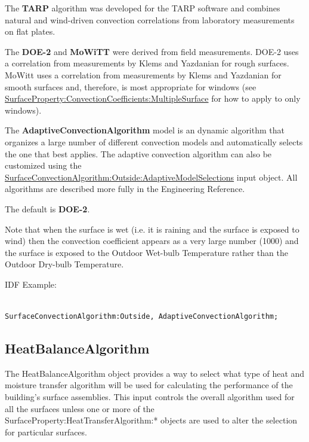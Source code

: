 The \textbf{TARP} algorithm was developed for the TARP software and combines natural and wind-driven convection correlations from laboratory measurements on flat plates.

The \textbf{DOE-2} and \textbf{MoWiTT} were derived from field measurements. DOE-2 uses a correlation from measurements by Klems and Yazdanian for rough surfaces. MoWitt uses a correlation from measurements by Klems and Yazdanian for smooth surfaces and, therefore, is most appropriate for windows (see \hyperref[surfacepropertyconvectioncoefficientsmultiplesurface]{SurfaceProperty:ConvectionCoefficients:MultipleSurface} for how to apply to only windows).

The \textbf{AdaptiveConvectionAlgorithm} model is an dynamic algorithm that organizes a large number of different convection models and automatically selects the one that best applies. The adaptive convection algorithm can also be customized using the \hyperref[surfaceconvectionalgorithmoutsideadaptivemodelselections]{SurfaceConvectionAlgorithm:Outside:AdaptiveModelSelections} input object. All algorithms are described more fully in the Engineering Reference.

The default is \textbf{DOE-2}.

Note that when the surface is wet (i.e. it is raining and the surface is exposed to wind) then the convection coefficient appears as a very large number (1000) and the surface is exposed to the Outdoor Wet-bulb Temperature rather than the Outdoor Dry-bulb Temperature.

IDF Example:

\begin{lstlisting}

SurfaceConvectionAlgorithm:Outside, AdaptiveConvectionAlgorithm;
\end{lstlisting}

\subsection{HeatBalanceAlgorithm}\label{heatbalancealgorithm}

The HeatBalanceAlgorithm object provides a way to select what type of heat and moisture transfer algorithm will be used for calculating the performance of the building's surface assemblies. This input controls the overall algorithm used for all the surfaces unless one or more of the SurfaceProperty:HeatTransferAlgorithm:* objects are used to alter the selection for particular surfaces.

